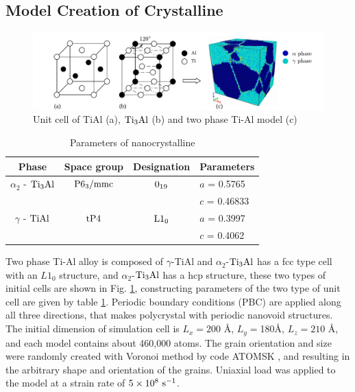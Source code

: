 \documentclass[Unknown,article,submit,moreauthors,pdftex,10pt,a4paper]{Definitions/mdpi}
\begin{document}
\subsection{Model Creation of Crystalline}
\begin{figure}[ht]
	\centering
	\includegraphics[width=1\linewidth]{img/modeling}
	\caption{Unit cell of \rm{TiAl} (a), $\rm{Ti_3Al}$ (b) and two phase Ti-Al model (c)}
	\label{fig:tial-cell}
\end{figure}

\begin{table}[ht]
	\caption{Parameters of nanocrystalline}
	\centering
	\begin{tabular}{c c c l}
	\toprule
	\textbf{Phase}			& {Space group}		& {Designation} 		& {Parameters} \\
	\midrule
	$\alpha_2$ - $\rm{Ti_3Al}$		& $\rm P6_3/mmc$ 	& $\rm 0_{19}$ 		& $a$ = 0.5765 \\
		&					&					& $c$ = 0.46833 \\
	$\gamma$ - $\rm{TiAl}$ 		& $\rm tP4$ 		& $\rm L1_0$		& $a$ = 0.3997 \\
		&					&					& $c$ = 0.4062 \\			
	\bottomrule
	\end{tabular} 
	\label{tab:lattice_parameter}
\end{table} 

Two phase Ti-Al alloy is composed of $\gamma $-TiAl and $\alpha_2$-$\rm Ti_3Al$ has a fcc type cell with an $L1_0$ structure, and $\alpha_2$-$\rm Ti_3Al$ has a hcp structure, these two types of initial cells are shown in Fig. \ref{fig:tial-cell}, constructing parameters of the two type of unit cell are given by table \ref{tab:lattice_parameter}. Periodic boundary conditions (PBC) are applied along all three directions, that makes polycrystal with periodic nanovoid structures. The initial dimension of simulation cell is $L_x =200$ \si{\angstrom}, $L_y = $180\si{\angstrom}, $L_z = 210$ \si{\angstrom}, and each model contains about 460,000 atoms. The grain orientation and size were randomly created with Voronoi method by code ATOMSK \cite{Hirel2015}, and resulting in the arbitrary shape and orientation of the grains. Uniaxial load was applied to the model at a strain rate of $5\times10^8\ \rm{s}^{-1}$. 
\end{document}
